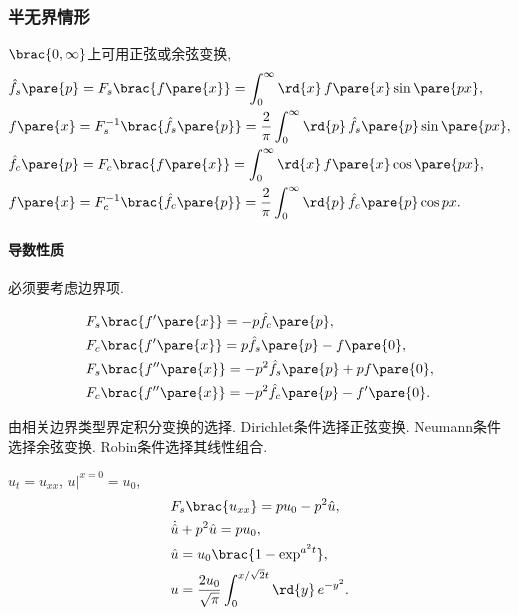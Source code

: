 \documentclass[hidelinks]{ctexart}
\begin{document}


\subsubsection{半无界情形} %
\label{ssub:半无界情形}

$\brac{0,\infty}$上可用正弦或余弦变换,
\begin{align*}
    & \hat f_s\pare{p} = F_s\brac{f\pare{x}} = \int_0^\infty \rd{x}\,f\pare{x} \sin\pare{px}, \\
    & f\pare{x} = F_s^{-1}\brac{\hat f_s\pare{p}} = \frac{2}{\pi} \int_0^\infty \rd{p}\, \hat f_s\pare{p} \sin\pare{px}, \\
    & \hat f_c\pare{p} = F_c\brac{f\pare{x}} = \int_0^\infty \rd{x}\, f\pare{x}\cos \pare{px}, \\
    & f\pare{x} = F_c^{-1}\brac{\hat f_c\pare{p}} = \frac{2}{\pi} \int_0^\infty\rd{p}\,\hat f_c\pare{p}\cos px.
\end{align*}

\paragraph{导数性质} %
\label{par:导数性质}

必须要考虑边界项.
\begin{resume}
\vspace{-\baselineskip}
\begin{align*}
    & F_s\brac{f'\pare{x}} = -p\hat f_c\pare{p}, \\
    & F_c\brac{f'\pare{x}} = p\hat f_s\pare{p} - f\pare{0}, \\
    & F_s\brac{f''\pare{x}} = -p^2\hat f_s\pare{p} + pf\pare{0}, \\
    & F_c\brac{f''\pare{x}} = -p^2 \hat f_c\pare{p} - f'\pare{0}.
\end{align*}
\end{resume}
\newpoint{}由相关边界类型界定积分变换的选择.
\newpoint{}Dirichlet条件选择正弦变换.
\newpoint{}Neumann条件选择余弦变换.
\newpoint{}Robin条件选择其线性组合.
\begin{sample}
    \begin{ex}
        $u_t = u_{xx}$, $u\vert^{x=0} = u_0$,
        \begin{align*}
            & F_s\brac{u_{xx}} = pu_0 - p^2 \hat{u}, \\
            & \dot{\hat{u}} + p^2 \hat u = pu_0, \\
            & \hat u = u_0 \brac{1-\exp^{a^2 t}}, \\
            & u = \frac{2u_0}{\sqrt{\pi}} \int_0^{x/\sqrt{2}t}\rd{y}\, e^{-y^2}.
        \end{align*}
    \end{ex}
\end{sample}
\end{document}
